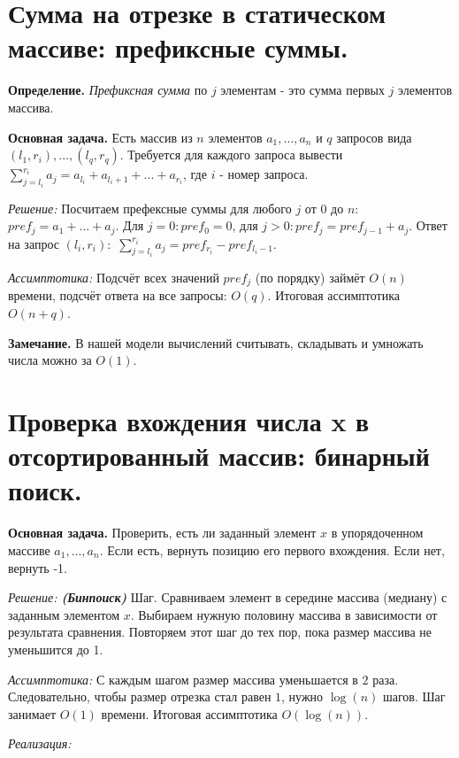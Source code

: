 \setcounter{section}{1}
\section{Сумма на отрезке в статическом массиве: префиксные суммы.}

\textbf{Определение.} \textit{Префиксная сумма} по $j$ элементам - это сумма первых $j$ элементов массива.

\textbf{Основная задача.} Есть массив из $n$ элементов $a_1, \ldots, a_n$ и $q$ запросов вида $(l_1, r_i), ..., (l_q, r_q)$. Требуется для каждого запроса вывести $\sum\limits_{j = l_i}^{r_i}a_j = a_{l_i} + a_{l_i + 1} + ... + a_{r_i}$, где $i$ - номер запроса. 

\textit{Решение:} Посчитаем префексные суммы для любого $j$ от $0$ до $n$: $pref_j = a_1 + ... + a_j$. Для $j = 0: pref_0 = 0$, для $j > 0: pref_j = pref_{j-1} + a_j$. Ответ на запрос $(l_i, r_i):$ $\sum\limits_{j = l_i}^{r_i}a_j = pref_{r_i} - pref_{l_i - 1}$.

\textit{Ассимптотика:} Подсчёт всех значений $pref_j$ (по порядку) займёт $O(n)$ времени, подсчёт ответа на все запросы: $O(q)$. Итоговая ассимптотика $O(n + q)$. 

\textbf{Замечание.} В нашей модели вычислений считывать, складывать и умножать числа можно за $O(1)$.

\setcounter{section}{2}
\section{Проверка вхождения числа x в отсортированный массив: бинарный поиск.}

\textbf{Основная задача.} Проверить, есть ли заданный элемент $x$ в упорядоченном массиве $a_1, ..., a_n$. Если есть, вернуть
позицию его первого вхождения. Если нет, вернуть -1.

\textit{Решение: \textbf{(Бинпоиск)}} 
Шаг. Сравниваем элемент в середине массива (медиану) с заданным элементом $x$. Выбираем нужную половину массива в зависимости от результата сравнения. Повторяем этот шаг до тех пор, пока размер массива не уменьшится до 1.

\textit{Ассимптотика:} 
С каждым шагом размер массива уменьшается в $2$ раза. Следовательно, чтобы размер отрезка стал равен $1$, нужно $\log(n)$ шагов. Шаг занимает $O(1)$ времени. Итоговая ассимптотика $O(\log(n)).$ 

\textit{Реализация:}



